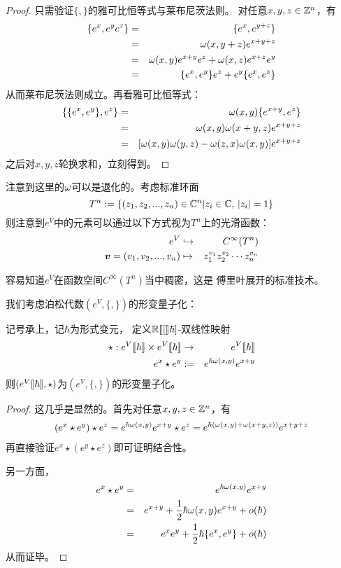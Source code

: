 \begin{proof}
只需验证$\{,\}$的雅可比恒等式与莱布尼茨法则。
对任意$x,y,z\in\mathbb{Z}^n$，有
\begin{eqnarray*}
     \{e^x,e^ye^z\}
&=&
     \{e^x,e^{y+z}\}\\
&=&
     \omega(x,y+z)e^{x+y+z}\\
&=&
     \omega(x,y)e^{x+y}e^z
    +\omega(x,z)e^{x+z}e^y\\
&=&
     \{e^x,e^y\}e^z
    +e^y\{e^x,e^z\}
\end{eqnarray*}
从而莱布尼茨法则成立。再看雅可比恒等式：
\begin{eqnarray*}
     \{\{e^x,e^y\},e^z\}
&=&
     \omega(x,y)\{e^{x+y},e^z\}\\
&=&
     \omega(x,y)\omega(x+y,z)e^{x+y+z}\\
&=&
     [\omega(x,y)\omega(y,z)-\omega(z,x)\omega(x,y)
     ]e^{x+y+z}
\end{eqnarray*}
之后对$x,y,z$轮换求和，立刻得到。
\end{proof}

注意到这里的$\omega$可以是退化的。考虑标准环面
$$T^{n}:=\{(z_1,z_2,...,z_n)\in\mathbb{C}^n|z_i\in\mathbb{C},\,|z_i|=1\}$$
则注意到$e^V$中的元素可以通过以下方式视为$T^n$上的光滑函数：
\begin{eqnarray*}
e^V&\hookrightarrow&C^{\infty}(T^n)\\
\boldsymbol{v}=(v_1,v_2,...,v_n)
&\mapsto&
z_1^{v_1}z_2^{v_2}\cdots z_n^{v_n}
\end{eqnarray*}

容易知道$e^V$在函数空间$C^{\infty}(T^n)$当中稠密，这是
傅里叶展开的标准技术。

我们考虑泊松代数$(e^V,\{,\})$的形变量子化：

\begin{prop}
记号承上，记$\hbar$为形式变元，
定义$\mathbb{R}[\![[]\!]\hbar]$-双线性映射
\begin{eqnarray*}
\star : e^V[\![\hbar]\!]\times e^V[\![\hbar]\!] &\to& e^V[\![\hbar]\!]\\
e^x\star e^y &:=& e^{\hbar\omega(x,y)}e^{x+y}
\end{eqnarray*}
则$(e^V[\![\hbar]\!],\star)$为$(e^V,\{,\})$的形变量子化。
\end{prop}
\begin{proof}
这几乎是显然的。首先对任意$x,y,z\in\mathbb{Z}^n$，有
\begin{eqnarray*}
     (e^x\star e^y)\star e^z
=
     e^{\hbar\omega(x,y)}e^{x+y}\star e^z
=
     e^{\hbar(\omega(x,y)+\omega(x+y,z))}e^{x+y+z}
\end{eqnarray*}
再直接验证$e^x\star(e^y\star e^z)$即可证明结合性。

另一方面，
\begin{eqnarray*}
     e^x\star e^y
&=&
     e^{\hbar\omega(x,y)}e^{x+y}\\
&=&
     e^{x+y}+\frac{1}{2}\hbar\omega(x,y)e^{x+y}+o(\hbar)\\
&=&
     e^xe^y+\frac{1}{2}\hbar\{e^x,e^y\}+o(\hbar)
\end{eqnarray*}
从而证毕。
\end{proof}


